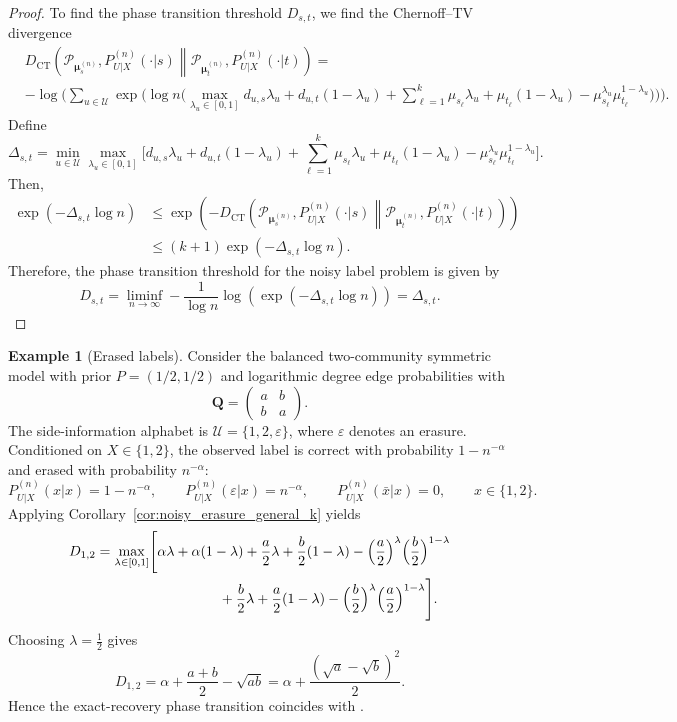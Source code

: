 \documentclass[11pt]{article}
\theoremstyle{plain}
\theoremstyle{definition}
\newtheorem{example}[theorem]{Example}
\begin{document}
\begin{proof}
To find the phase transition threshold $D_{s,t}$, we find the Chernoff--TV divergence
\begin{align*}
& D_{\mathrm{CT}}\left(\mathcal{P}_{\bm{\mu}_s^{(n)}} , P^{(n)}_{U|X}(\cdot|s) \middle\|  \mathcal{P}_{\bm{\mu}_t^{(n)}} , P^{(n)}_{U|X}(\cdot|t) \right)= \nonumber \\
&-\log\Biggl(\sum_{u \in \mathcal{U}} 
\exp\Biggl(\log n  \Biggl( \max_{\lambda_u \in [0,1]} 
d_{u,s} \lambda_u + d_{u,t} (1-\lambda_u) +
\sum_{\ell=1}^k \mu_{s_\ell} \lambda_u + \mu_{t_\ell}(1-\lambda_u) 
-\mu_{s_\ell}^{\lambda_u} \mu_{t_\ell}^{1-\lambda_u} \Biggr)\Biggr) \Biggr).
\end{align*} 
Define
\[
\Delta_{s,t} = \min_{u\in\mathcal{U}} \max_{\lambda_u \in [0,1]} \Biggl[
d_{u,s} \lambda_u + d_{u,t} (1-\lambda_u) +
\sum_{\ell=1}^k \mu_{s_\ell} \lambda_u + \mu_{t_\ell}(1-\lambda_u) 
-\mu_{s_\ell}^{\lambda_u} \mu_{t_\ell}^{1-\lambda_u}\Biggr].
\]
Then,
\begin{align*}
 \exp(-\Delta_{s,t}\log n) 
  &\le \exp\left(-D_{\mathrm{CT}}\left(\mathcal{P}_{\bm{\mu}_s^{(n)}} , P^{(n)}_{U|X}(\cdot|s) \middle\|  \mathcal{P}_{\bm{\mu}_t^{(n)}} , P^{(n)}_{U|X}(\cdot|t) \right)\right) \\
  &\le (k+1)\exp(-\Delta_{s,t} \log n).
\end{align*}
Therefore, the phase transition threshold for the noisy label problem
is given by
\[
 D_{s,t}=\liminf_{n \to \infty}  - \frac{1}{\log n}
    \log(\exp(-\Delta_{s,t} \log n)) = \Delta_{s,t}.
\]
\end{proof}

\begin{example}[Erased labels]\label{exm:erase}
Consider the balanced two-community symmetric model with prior $P=(1/2,1/2)$ and logarithmic degree edge probabilities with
\[
\mathbf{Q}=
\begin{pmatrix}
a & b\\
b & a
\end{pmatrix}.
\]
The side-information alphabet is $\mathcal{U}=\{1,2,\varepsilon\}$, where $\varepsilon$ denotes an erasure. Conditioned on $X\in\{1,2\}$, the observed label is correct with probability $1-n^{-\alpha}$ and erased with probability $n^{-\alpha}$:
\[
P_{U|X}^{(n)}(x|x)=1-n^{-\alpha},\qquad
P_{U|X}^{(n)}(\varepsilon|x)=n^{-\alpha},\qquad
P_{U|X}^{(n)}(\bar x|x)=0,\qquad x\in\{1,2\}.
\]
Applying Corollary~\ref{cor:noisy_erasure_general_k} yields
\begin{align*}
D_{1,2}
&=\max_{\lambda\in[0,1]}
\Biggl[
\alpha\lambda+\alpha(1-\lambda)
+\frac{a}{2}\lambda+\frac{b}{2}(1-\lambda)-\Bigl(\frac{a}{2}\Bigr)^\lambda\Bigl(\frac{b}{2}\Bigr)^{1-\lambda}\\
&\hspace{3.1cm}
+\frac{b}{2}\lambda+\frac{a}{2}(1-\lambda)-\Bigl(\frac{b}{2}\Bigr)^\lambda\Bigl(\frac{a}{2}\Bigr)^{1-\lambda}
\Biggr].
\end{align*}
Choosing $\lambda=\tfrac12$ gives
\[
D_{1,2}
=\alpha+\frac{a+b}{2}-\sqrt{ab}
=\alpha+\frac{(\sqrt a-\sqrt b)^2}{2}.
\]
Hence the exact-recovery phase transition coincides with \citep{SN18}.
\end{example}
\end{document}
